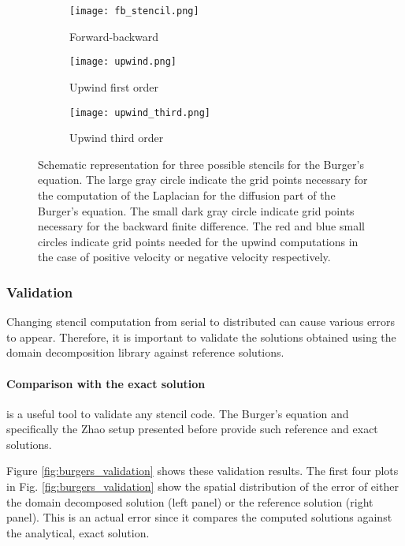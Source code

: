 \begin{figure}[!htbp]
\centering
\begin{subfigure}{.3\textwidth}
  \centering
  \texttt{[image: fb\_stencil.png]}
  \caption{Forward-backward}
  \label{fig:fb_stencil}
\end{subfigure}%
\begin{subfigure}{.3\textwidth}
  \centering
  \texttt{[image: upwind.png]}
  \caption{Upwind first order}
  \label{fig:upwind_stencil}
\end{subfigure}
\begin{subfigure}{.3\textwidth}
  \centering
  \texttt{[image: upwind\_third.png]}
  \caption{Upwind third order}
  \label{fig:upwind_third_stencil}
\end{subfigure}
\caption{Schematic representation for three possible stencils for the Burger's equation. The large gray circle indicate the grid points necessary for the computation of the Laplacian for the diffusion part of the Burger's equation. The small dark gray circle indicate grid points necessary for the backward finite difference. The red and blue small circles indicate grid points needed for the upwind computations in the case of positive velocity or negative velocity respectively.}
\label{fig:burger_stencils}
\end{figure}

\subsubsection{Validation}
Changing stencil computation from serial to distributed can cause various errors to appear.
Therefore, it is important to validate the solutions obtained using the domain decomposition library against reference solutions.

\paragraph{Comparison with the exact solution} is a useful tool to validate any stencil code.
The Burger's equation and specifically the Zhao setup presented before provide such reference and exact solutions.

Figure \ref{fig:burgers_validation} shows these validation results. The first four plots in Fig. \ref{fig:burgers_validation} show the spatial distribution of the error of either the domain decomposed solution (left panel) or the reference solution (right panel).
This is an actual error since it compares the computed solutions against the analytical, exact solution.

